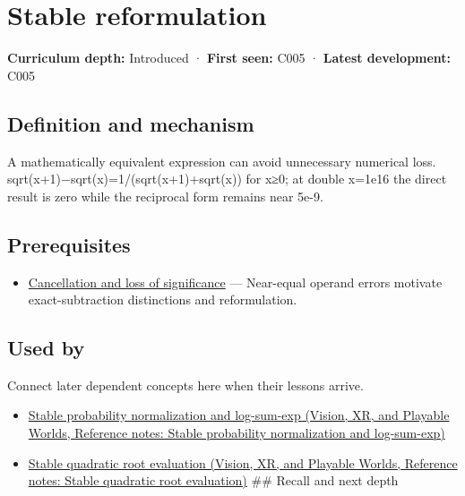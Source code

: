 \hypertarget{appendix-d7f8ba961670}{}\label{referencestart:appendix-d7f8ba961670}
\section{Stable reformulation}\label{appendix-d7f8ba961670-stable-reformulation}

\textbf{Curriculum depth:} Introduced · \textbf{First seen:} C005 · \textbf{Latest development:} C005

\begin{allmightroledefinition}

\subsection{Definition and mechanism}\label{appendix-d7f8ba961670-definition-and-mechanism}

A mathematically equivalent expression can avoid unnecessary numerical loss. sqrt(x+1)−sqrt(x)=1/(sqrt(x+1)+sqrt(x)) for x≥0; at double x=1e16 the direct result is zero while the reciprocal form remains near 5e-9.

\end{allmightroledefinition}

\subsection{Prerequisites}\label{appendix-d7f8ba961670-prerequisites}

\begin{itemize}
\tightlist
\item
  \hyperref[appendix-a2773a6a2f9d]{Cancellation and loss of significance} --- Near-equal operand errors motivate exact-subtraction distinctions and reformulation.
\end{itemize}

\subsection{Used by}\label{appendix-d7f8ba961670-used-by}

Connect later dependent concepts here when their lessons arrive.

\begin{itemize}
\tightlist
\item
  \href{../07-Vision-XR-and-Playable-Worlds/main.pdf\#nameddest=appendix-d580b422240f}{Stable probability normalization and log-sum-exp (Vision, XR, and Playable Worlds, Reference notes: Stable probability normalization and log-sum-exp)}
\item
  \href{../07-Vision-XR-and-Playable-Worlds/main.pdf\#nameddest=appendix-b9afba7f63e5}{Stable quadratic root evaluation (Vision, XR, and Playable Worlds, Reference notes: Stable quadratic root evaluation)} \#\# Recall and next depth
\end{itemize}

